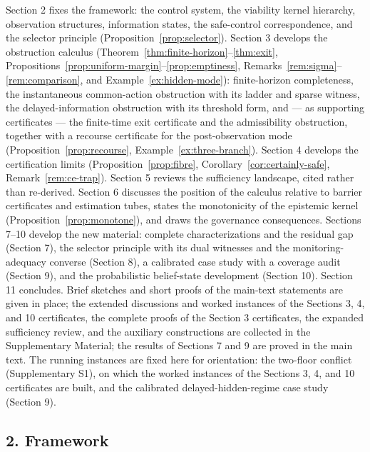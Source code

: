 \documentclass[10pt,twocolumn]{article}
\theoremstyle{definition}
\begin{document}
Section 2 fixes the framework: the control system, the viability kernel
hierarchy, observation structures, information states, the safe-control
correspondence, and the selector principle (Proposition~\ref{prop:selector}). Section 3 develops the obstruction calculus (Theorem~\ref{thm:finite-horizon}--\ref{thm:exit}, Propositions~\ref{prop:uniform-margin}--\ref{prop:emptiness}, Remarks~\ref{rem:sigma}--\ref{rem:comparison}, and Example~\ref{ex:hidden-mode}): finite-horizon completeness, the instantaneous common-action obstruction with its ladder and sparse witness, the delayed-information obstruction with its threshold form, and --- as supporting certificates --- the finite-time exit certificate and the admissibility obstruction, together with a recourse certificate for the post-observation mode (Proposition~\ref{prop:recourse}, Example~\ref{ex:three-branch}). Section 4 develops the certification limits
(Proposition~\ref{prop:fibre}, Corollary~\ref{cor:certainly-safe}, Remark~\ref{rem:ce-trap}). Section 5 reviews the sufficiency landscape, cited rather than re-derived. Section
6 discusses the position of the calculus relative to barrier
certificates and estimation tubes, states the monotonicity of the
epistemic kernel (Proposition~\ref{prop:monotone}), and draws the governance
consequences. Sections 7--10 develop the new material: complete characterizations and the residual gap (Section 7), the selector principle with its dual witnesses and the monitoring-adequacy converse (Section 8), a calibrated case study with a coverage audit (Section 9), and the probabilistic belief-state development (Section 10). Section 11 concludes. Brief sketches and short proofs of the main-text statements are given in place; the extended discussions and worked instances of the Sections 3, 4, and 10 certificates, the complete proofs of the Section 3 certificates, the expanded sufficiency review, and the auxiliary constructions are collected in the Supplementary Material; the results of Sections 7 and 9 are proved in the main text. The running
instances are fixed here for orientation: the two-floor conflict
(Supplementary S1), on which the worked instances of the Sections 3, 4,
and 10 certificates are built, and the calibrated delayed-hidden-regime
case study (Section 9).



\subsection{2. Framework}\label{framework}
\end{document}

